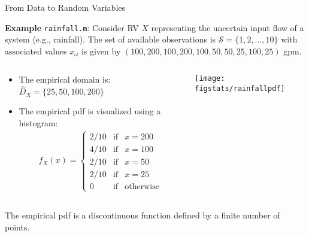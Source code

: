 \documentclass[9pt]{beamer}
\begin{document}
\begin{frame}{From Data to Random Variables}
\begin{block}{}
{\bf Example} {\tt rainfall.m}:  Consider RV $X$ representing the uncertain input flow of a system (e.g., rainfall). The set of available observations is $\mathcal{S}=\{1,2,...,10\}$ with associated values $x_\omega$ is given by $(100,200,100,200,100,50,50,25,100,25)$ gpm. 
\end{block}
\vspace{0.1in}
  \begin{columns}
    \begin{column}{0.5\textwidth}
\begin{itemize}    
\item The empirical domain is: $\hat{D}_X=\{25,50,100,200\}$
\item The empirical pdf is visualized using a histogram:    
\begin{align*}
\hat{f}_X(x)=\left\{\begin{array}{ccl}2/10&\textrm{if}&x=200\\ 4/10&\textrm{if}&x=100\\ 2/10 &\textrm{if}&x=50\\ 2/10&\textrm{if}&x=25\\
0&\textrm{if}&\textrm{otherwise} \end{array}\right.
\end{align*}
\end{itemize}
\end{column}
 \begin{column}{0.5\textwidth}
       \texttt{[image: figstats/rainfallpdf]}\\
 \end{column}
\end{columns}
The empirical pdf is a discontinuous function defined by a finite number of points. 
\end{frame}
\end{document}
